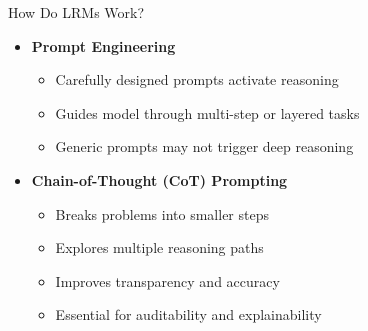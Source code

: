 \begin{frame}[allowframebreaks]{How Do LRMs Work?}
\begin{itemize}
\begin{itemize}
        \end{itemize}
        \item \textbf{Prompt Engineering}
        \begin{itemize}
            \item Carefully designed prompts activate reasoning
            \item Guides model through multi-step or layered tasks
            \item Generic prompts may not trigger deep reasoning
        \end{itemize}
        \item \textbf{Chain-of-Thought (CoT) Prompting}
        \begin{itemize}
            \item Breaks problems into smaller steps
            \item Explores multiple reasoning paths
            \item Improves transparency and accuracy
            \item Essential for auditability and explainability
        \end{itemize}
    \end{itemize}
\end{frame}

